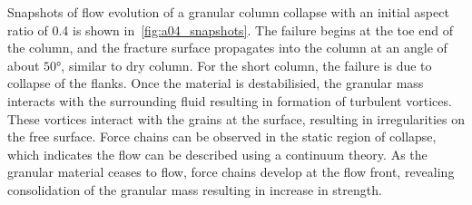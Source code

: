 Snapshots of flow evolution of a granular column collapse with an initial 
aspect ratio of 0.4 is shown in~\cref{fig:a04_snapshots}. The failure begins at 
the toe end of the column, and the fracture surface propagates into the column 
at an angle of about $50\si{\degree}$, similar to dry column. For the short 
column, the failure is due to collapse of the flanks. Once the material is 
destabilisied, the granular mass interacts with the surrounding fluid resulting 
in formation of turbulent vortices. These vortices interact with the grains at 
the surface, resulting in irregularities on the free surface. Force chains can 
be observed in the static region of collapse, which indicates the flow can be 
described using a continuum theory. As the granular material ceases to flow, 
force chains develop at the flow front, revealing consolidation of the granular 
mass resulting in increase in strength. 

